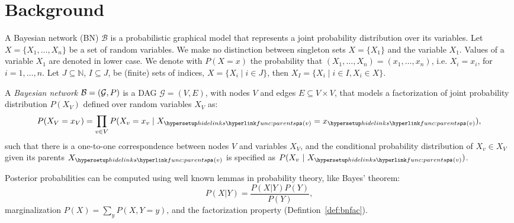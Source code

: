 
\section{Background}
\label{sec:background}

A Bayesian network (BN) $\mathcal{B}$ is a probabilistic graphical model that represents a joint probability distribution over its variables. Let $X = \{X_1,\ldots,X_n\}$ be a set of random variables. We make no distinction between singleton sets $X = \{X_1\}$ and the variable $X_1$. Values of a variable $X_1$ are denoted in lower case.
We denote with $P(X = x)$ the probability that $(X_1,\ldots,X_n) = (x_1,\ldots,x_n)$,
i.e. $X_i = x_i$, for $i =1,\ldots,n$.
Let $J \subseteq \mathbb{N}$, $I \subseteq J$, be (finite) sets of indices, $X = \{X_i \mid i \in J\}$, then $X_I = \{X_i \mid i \in I, X_i \in X\}$. %

\begin{definition}\label{def:bnfac}
    \ULforem
    A \emph{Bayesian network} $\mathcal{B} = \left( \mathcal{G},P \right)$ is a DAG $\mathcal{G} = (V,E)$, with nodes $V$ and edges $E \subseteq V \times V$, that models a factorization of joint probability distribution $P(X_V)$ defined over random variables $X_V$ as:%
    \begin{equation}
    P(X_V = x_V) = \prod_{v \in V}P(X_v = x_v \mid X_{\myparents(v)}= x_{\myparents(v)}),
    \end{equation}%
    \noindent such that there is a one-to-one correspondence between nodes $V$ and variables $X_V$, and the conditional probability distribution of $X_v \in X_V$ given its parents $X_{\myparents(v)}$ is specified as $P(X_v\ |\ X_{\myparents(v)})$.

\end{definition}

Posterior probabilities can be computed using well known lemmas in probability theory, like Bayes’ theorem:
\[P(X | Y) = \frac{P(X | Y)P(Y)}{P(Y)},\]
marginalization $P(X) = \sum_{y} P(X, Y = y)$, and the factorization property (Defintion~\ref{def:bnfac}).


